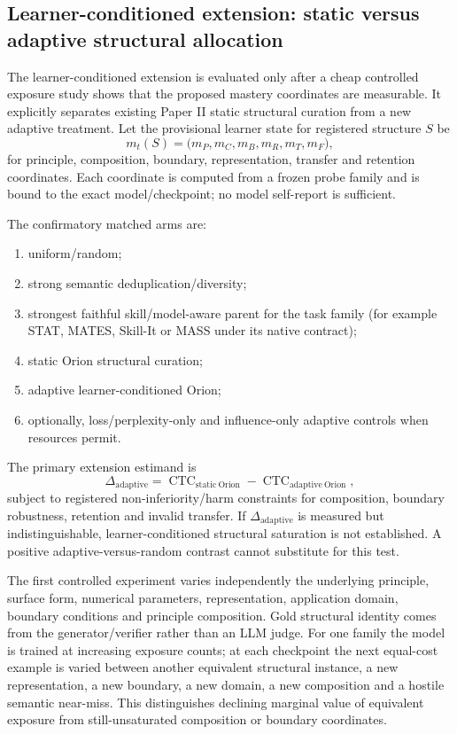 \subsection{Learner-conditioned extension: static versus adaptive structural allocation}

The learner-conditioned extension is evaluated only after a cheap controlled exposure study shows that the proposed mastery coordinates are measurable. It explicitly separates existing Paper II static structural curation from a new adaptive treatment. Let the provisional learner state for registered structure $S$ be
\[
m_t(S)=\bigl(m_P,m_C,m_B,m_R,m_T,m_F\bigr),
\]
for principle, composition, boundary, representation, transfer and retention coordinates. Each coordinate is computed from a frozen probe family and is bound to the exact model/checkpoint; no model self-report is sufficient.

The confirmatory matched arms are:
\begin{enumerate}[leftmargin=*]
\item uniform/random;
\item strong semantic deduplication/diversity;
\item strongest faithful skill/model-aware parent for the task family (for example STAT, MATES, Skill-It or MASS under its native contract);
\item static Orion structural curation;
\item adaptive learner-conditioned Orion;
\item optionally, loss/perplexity-only and influence-only adaptive controls when resources permit.
\end{enumerate}
The primary extension estimand is
\[
\Delta_{\mathrm{adaptive}}=
\operatorname{CTC}_{\mathrm{static\ Orion}}-
\operatorname{CTC}_{\mathrm{adaptive\ Orion}},
\]
subject to registered non-inferiority/harm constraints for composition, boundary robustness, retention and invalid transfer. If $\Delta_{\mathrm{adaptive}}$ is measured but indistinguishable, learner-conditioned structural saturation is not established. A positive adaptive-versus-random contrast cannot substitute for this test.

The first controlled experiment varies independently the underlying principle, surface form, numerical parameters, representation, application domain, boundary conditions and principle composition. Gold structural identity comes from the generator/verifier rather than an LLM judge. For one family the model is trained at increasing exposure counts; at each checkpoint the next equal-cost example is varied between another equivalent structural instance, a new representation, a new boundary, a new domain, a new composition and a hostile semantic near-miss. This distinguishes declining marginal value of equivalent exposure from still-unsaturated composition or boundary coordinates.

